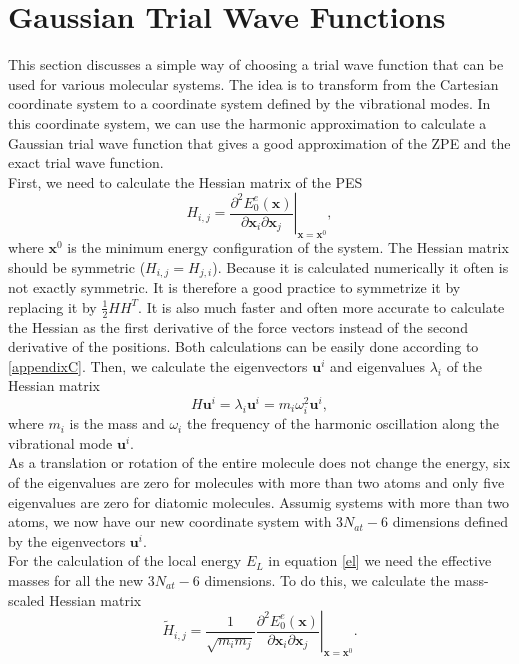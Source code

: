 \documentclass [12pt]{report}
\begin{document}
\section{Gaussian Trial Wave Functions}
This section discusses a simple way of choosing a trial wave function that can be used for various molecular systems. The idea is to transform from the Cartesian coordinate system to a coordinate system defined by the vibrational modes. In this coordinate system, we can use the harmonic approximation to calculate a Gaussian trial wave function that gives a good approximation of the ZPE and the exact trial wave function.\\
First, we need to calculate the Hessian matrix of the PES
\begin{equation}
H_{i,j} = \left. \frac{\partial^2 E_0^e(\bm{x})}{\partial \bm{x}_i \partial \bm{x}_j }\right|_{\bm{x} = \bm{x}^0},
\end{equation}
where $\bm{x}^0$ is the minimum energy configuration of the system. The Hessian matrix should be symmetric ($H_{i,j} = H_{j,i}$). Because it is calculated numerically it often is not exactly symmetric. It is therefore a good practice to symmetrize it by replacing it by $\frac{1}{2} H H^T$. It is also much faster and often more accurate to calculate the Hessian as the first derivative of the force vectors instead of the second derivative of the positions. Both calculations can be easily done according to \ref{appendixC}.
Then, we calculate the eigenvectors $\bm{u}^i$ and  eigenvalues $\lambda_i$ of the Hessian matrix
\begin{equation} \label{eigs}
H \bm{u}^i = \lambda_i \bm{u}^i = m_i \omega_i^2 \bm{u}^i,
\end{equation}
where $m_i$ is the mass and $\omega_i$ the frequency of the harmonic oscillation along the vibrational mode $\bm{u}^i$.\\
As a translation or rotation of the entire molecule does not change the energy, six of the eigenvalues are zero for molecules with more than two atoms and only five eigenvalues are zero for diatomic molecules. Assumig systems with more than two atoms, we now have our new coordinate system with $3 N_{at} - 6$ dimensions defined by the eigenvectors $\bm{u}^i$.\\
For the calculation of the local energy $E_L$ in equation \eqref{el} we need the effective masses for all the new $3 N_{at} - 6$ dimensions. To do this, we calculate the mass-scaled Hessian matrix
\begin{equation}
\tilde{H}_{i,j} = \left. \frac{1}{\sqrt{m_i m_j}}\frac{\partial^2 E_0^e(\bm{x})}{ \partial \bm{x}_i \partial \bm{x}_j }\right|_{\bm{x} = \bm{x}^0}.
\end{equation}
\end{document}

